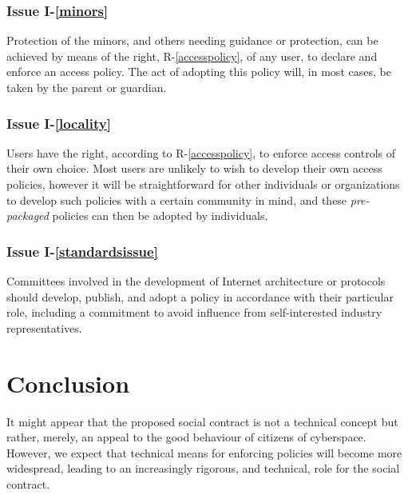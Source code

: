 \subsubsection*{Issue I-\ref{minors}}\label{minorssol}

Protection of the minors, and others needing guidance or
protection, can be achieved by means of the right, R-\ref{accesspolicy}, of any
user, to declare and enforce an access policy. The act of adopting
this policy will, in most cases, be taken by the parent or guardian.

\subsubsection*{Issue I-\ref{locality}}\label{localitysol}

Users have the right, according to R-\ref{accesspolicy}, to enforce
access controls of their own choice. Most users are unlikely to wish to
develop their own access policies, however it will be straightforward
for other individuals or organizations to develop such policies with
a certain community in mind, and these {\em pre-packaged} policies
can then be adopted by individuals.


\subsubsection*{Issue I-\ref{standardsissue}}\label{standardssol}

Committees involved in the development of Internet architecture or protocols
should develop, publish, and adopt a policy in accordance with their
particular role, including a commitment to avoid 
influence from self-interested industry representatives.

\section{Conclusion}\label{conc}

It might appear that the proposed social contract is not a technical concept but rather, merely, an appeal to the good behaviour of citizens of cyberspace. However, we expect that technical means for enforcing policies will become more widespread, leading to an increasingly rigorous, and technical, role for the social contract.

